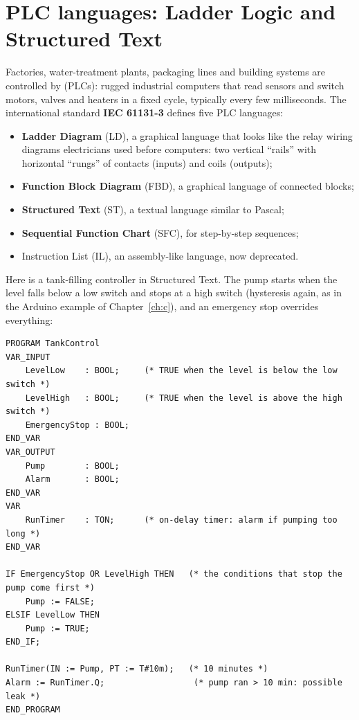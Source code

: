 \section{PLC languages: Ladder Logic and Structured Text}
\label{sec:plc}

Factories, water-treatment plants, packaging lines and building systems are controlled by
 (PLCs): rugged industrial computers that read sensors
and switch motors, valves and heaters in a fixed cycle, typically every few milliseconds.
The international standard \textbf{IEC 61131-3} defines five PLC languages:
\begin{itemize}
\item \textbf{Ladder Diagram} (LD), a graphical language that looks like the relay wiring
  diagrams electricians used before computers: two vertical ``rails'' with horizontal
  ``rungs'' of contacts (inputs) and coils (outputs);
\item \textbf{Function Block Diagram} (FBD), a graphical language of connected blocks;
\item \textbf{Structured Text} (ST), a textual language similar to Pascal;
\item \textbf{Sequential Function Chart} (SFC), for step-by-step sequences;
\item Instruction List (IL), an assembly-like language, now deprecated.
\end{itemize}
Here is a tank-filling controller in Structured Text. The pump starts when the level falls
below a low switch and stops at a high switch (hysteresis again, as in the Arduino example
of Chapter~\ref{ch:c}), and an emergency stop overrides everything:
\begin{lstlisting}[language=StructuredText]
PROGRAM TankControl
VAR_INPUT
    LevelLow    : BOOL;     (* TRUE when the level is below the low switch *)
    LevelHigh   : BOOL;     (* TRUE when the level is above the high switch *)
    EmergencyStop : BOOL;
END_VAR
VAR_OUTPUT
    Pump        : BOOL;
    Alarm       : BOOL;
END_VAR
VAR
    RunTimer    : TON;      (* on-delay timer: alarm if pumping too long *)
END_VAR

IF EmergencyStop OR LevelHigh THEN   (* the conditions that stop the pump come first *)
    Pump := FALSE;
ELSIF LevelLow THEN
    Pump := TRUE;
END_IF;

RunTimer(IN := Pump, PT := T#10m);   (* 10 minutes *)
Alarm := RunTimer.Q;                  (* pump ran > 10 min: possible leak *)
END_PROGRAM
\end{lstlisting}
